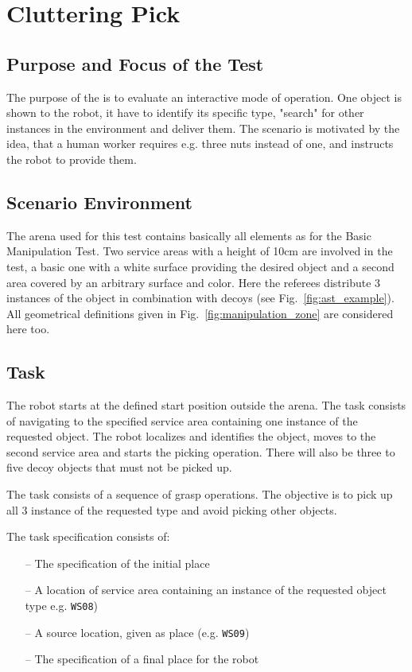 \newpage
\section{Cluttering Pick}

\subsection{Purpose and Focus of the Test}
The purpose of the  is to evaluate an interactive
mode of operation. One object is shown to the robot, it have to identify
its specific type, "search" for other instances in the environment and deliver them. The scenario is motivated by
the idea, that a human worker requires e.g. three nuts instead of one, and instructs the robot to provide them.

\subsection{Scenario Environment}
The arena used for this test contains basically all elements as for the Basic
Manipulation Test. Two service areas with a height of 10cm are involved in the test, a basic one with a white surface providing the desired object
and a second area covered by an arbitrary surface and color. Here the referees distribute
3 instances of the object in combination with decoys (see Fig.~\ref{fig:ast_example}). All geometrical definitions given in Fig.~\ref{fig:manipulation_zone} are considered here too.

\subsection{Task}
The robot starts at the defined start position outside the arena.
The task consists of navigating to the specified service area containing one instance of the
requested object. The robot localizes and identifies the object, moves to the
second service area and starts the picking operation. There will also be three to five decoy objects that must not be picked up.
\par
The task consists of a sequence of grasp operations. The objective is to pick up all 3 instance of the requested type and avoid picking other objects.
\par
The task specification consists of:
\begin{itemize}
	\item[--] The specification of the initial place
  \item[--] A location of service area containing an instance of the requested object type e.g. \texttt{WS08})
	\item[--] A source location, given as place (e.g. \texttt{WS09})
	\item[--] The specification of a final place for the robot
\end{itemize}


